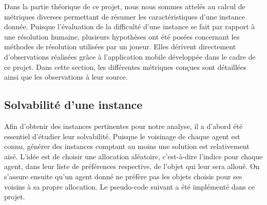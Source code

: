 \documentclass[../main.tex]{subfiles}
\begin{document}
	Dans la partie théorique de ce projet, nous nous sommes attelés au calcul de métriques diverses permettant de résumer les caractéristiques d'une instance donnée. Puisque l'évaluation de la difficulté d'une instance se fait par rapport à une résolution humaine, plusieurs hypothèses ont été posées concernant les méthodes de résolution utilisées par un joueur. Elles dérivent directement d'observations réalisées grâce à l'application mobile développée dans le cadre de ce projet. Dans cette section, les différentes métriques conçues sont détaillées ainsi que les observations à leur source.
	
	\subsection{Solvabilité d'une instance}
	Afin d'obtenir des instances pertinentes pour notre analyse, il a d'abord été essentiel d'étudier leur solvabilité. Puisque le voisinage de chaque agent est connu, générer des instances comptant au moins une solution est relativement aisé. L'idée est de choisir une allocation aléatoire, c'est-à-dire l'indice pour chaque agent, dans leur liste de préférences respective, de l'objet qui leur sera alloué. On s'assure ensuite qu'un agent donné ne préfère pas les objets choisis pour ses voisins à sa propre allocation. Le pseudo-code suivant a été implémenté dans ce projet. 
\end{document}
